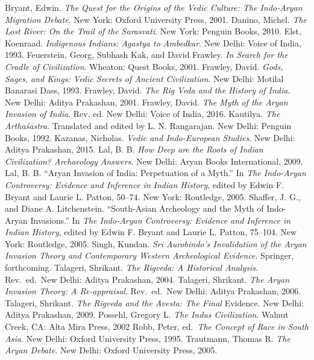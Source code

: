 \begin{thebibliography}{99}
 Bryant, Edwin. \textit{The Quest for the Origins of the Vedic Culture: The Indo-Aryan Migration Debate}. New York: Oxford University Press, 2001.
 Danino, Michel. \textit{The Lost River: On the Trail of the Sarasvati}. New York: Penguin Books, 2010.
 Elst, Koenraad. \textit{Indigenous Indians: Agastya to Ambedkar}. New Delhi: Voice of India, 1993.
 Feuerstein, Georg, Subhash Kak, and David Frawley. \textit{In Search for the Cradle of Civilization}. Wheaton: Quest Books, 2001.
 Frawley, David. \textit{Gods, Sages, and Kings: Vedic Secrets of Ancient Civilization}. New Delhi: Motilal Banarasi Dass, 1993.
 Frawley, David. \textit{The Rig Veda and the History of India}. New Delhi: Aditya Prakashan, 2001. 
 Frawley, David. \textit{The Myth of the Aryan Invasion of India}. Rev. ed. New Delhi: Voice of India, 2016.
 Kautilya. \textit{The Arthaśāstra}. Translated and edited by L. N. Rangarajan. New Delhi: Penguin Books, 1992.
 Kazanas, Nicholas. \textit{Vedic and Indo-European Studies}. New Delhi: Aditya Prakashan, 2015.
 Lal, B. B. \textit{How Deep are the Roots of Indian Civilization? Archaeology Answers}. New Delhi: Aryan Books International, 2009.
 Lal, B. B. “Aryan Invasion of India: Perpetuation of a Myth.” In \textit{The Indo-Aryan Controversy: Evidence and Inference in Indian History}, edited by Edwin F. Bryant and Laurie L. Patton, 50--74. New York: Routledge, 2005.
 Shaffer, J. G., and Diane A. Litchenstein. “South-Asian Archeology and the Myth of Indo-Aryan Invasions.” In \textit{The Indo-Aryan Controversy: Evidence and Inference in Indian History}, edited by Edwin F. Bryant and Laurie L. Patton, 75--104. New York: Routledge, 2005.
 Singh, Kundan. \textit{Sri Aurobindo’s Invalidation of the Aryan Invasion Theory and Contemporary Western Archeological Evidence}. Springer, forthcoming. 
 Talageri, Shrikant. \textit{The Rigveda: A Historical Analysis}. Rev.\ ed.\ New Delhi: Aditya Prakashan, 2004. 
 Talageri, Shrikant. \textit{The Aryan Invasion Theory: A Re-appraisal}. Rev.\ ed.\ New Delhi: Aditya Prakashan, 2006.
 Talageri, Shrikant. \textit{The Rigveda and the Avesta: The Final} Evidence. New Delhi: Aditya Prakashan, 2009.
 Possehl, Gregory L. \textit{The Indus Civilization}. Walnut Creek, CA: Alta Mira Press, 2002
 Robb, Peter, ed.\ \textit{The Concept of Race in South Asia}. New Delhi: Oxford University Press, 1995. 
 Trautmann, Thomas R. \textit{The Aryan Debate}. New Delhi: Oxford University Press, 2005.
\end{thebibliography}
\newpage

